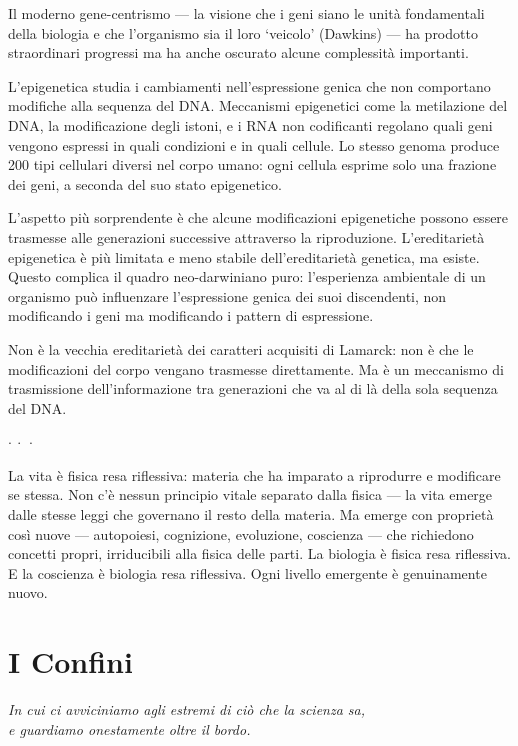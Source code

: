 \documentclass[12pt,a4paper,openany]{book}
\newcommand{\sezione}[1]{\vspace{1.2em}{\large\bfseries #1}\vspace{0.5em}\par}
\newcommand{\puntini}{\begin{center}$\cdot\ \cdot\ \cdot$\end{center}\vspace{0.3em}}
\begin{document}
\sezione{L'epigenetica e i limiti del gene-centrismo}

Il moderno gene-centrismo --- la visione che i geni siano le unità fondamentali della biologia e che l'organismo sia il loro `veicolo' (Dawkins) --- ha prodotto straordinari progressi ma ha anche oscurato alcune complessità importanti.

L'epigenetica studia i cambiamenti nell'espressione genica che non comportano modifiche alla sequenza del DNA. Meccanismi epigenetici come la metilazione del DNA, la modificazione degli istoni, e i RNA non codificanti regolano quali geni vengono espressi in quali condizioni e in quali cellule. Lo stesso genoma produce 200 tipi cellulari diversi nel corpo umano: ogni cellula esprime solo una frazione dei geni, a seconda del suo stato epigenetico.

L'aspetto più sorprendente è che alcune modificazioni epigenetiche possono essere trasmesse alle generazioni successive attraverso la riproduzione. L'ereditarietà epigenetica è più limitata e meno stabile dell'ereditarietà genetica, ma esiste. Questo complica il quadro neo-darwiniano puro: l'esperienza ambientale di un organismo può influenzare l'espressione genica dei suoi discendenti, non modificando i geni ma modificando i pattern di espressione.

Non è la vecchia ereditarietà dei caratteri acquisiti di Lamarck: non è che le modificazioni del corpo vengano trasmesse direttamente. Ma è un meccanismo di trasmissione dell'informazione tra generazioni che va al di là della sola sequenza del DNA.

\puntini

La vita è fisica resa riflessiva: materia che ha imparato a riprodurre e modificare se stessa. Non c'è nessun principio vitale separato dalla fisica --- la vita emerge dalle stesse leggi che governano il resto della materia. Ma emerge con proprietà così nuove --- autopoiesi, cognizione, evoluzione, coscienza --- che richiedono concetti propri, irriducibili alla fisica delle parti. La biologia è fisica resa riflessiva. E la coscienza è biologia resa riflessiva. Ogni livello emergente è genuinamente nuovo.

\part{I Confini}
\begin{center}
\itshape
In cui ci avviciniamo agli estremi di ciò che la scienza sa,\\
e guardiamo onestamente oltre il bordo.
\end{center}
\clearpage
\end{document}
